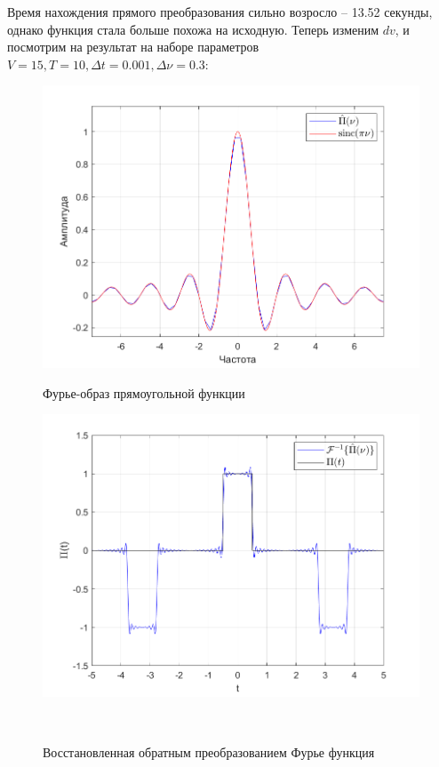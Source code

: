 \documentclass[a4paper]{article}
\begin{document}
Время нахождения прямого преобразования сильно возросло -- 13.52 секунды, однако функция стала больше похожа на исходную. Теперь изменим $dv$, и посмотрим на результат на наборе параметров $V = 15, T = 10, \Delta t = 0.001, \Delta \nu=0.3$:

\begin{figure}[H]
    \begin{minipage}{0.5\textwidth}
        \centering \includegraphics[width=\textwidth]{graphs/1/T_10_dt_0.001_V_15_dv_0.3/fourier_numerical.png}
        \caption{Фурье-образ прямоугольной функции}
    \end{minipage}\hfill
    \begin{minipage}{0.5\textwidth}
        \centering \includegraphics[width=\textwidth]{graphs/1/T_10_dt_0.001_V_15_dv_0.3/func_inversed_fourier.png}
        \caption{Восстановленная обратным преобразованием Фурье функция}
    \end{minipage}\\[1em]
\end{figure}\noindent\
\end{document}
